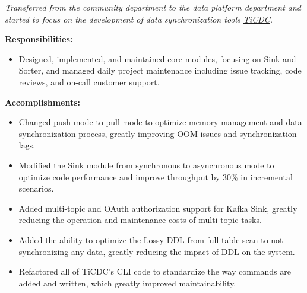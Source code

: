 \documentclass{software_engineer_dongpo_liu}
\newcommand{\en}[1]{#1}
\newcommand{\zh}[1]{}
\begin{document}
\en{}
\zh{\datedsubsection{\textbf{\href{https://pingcap.com/zh/}{PingCAP Inc. - 数据库 - 数据库工具研发（Golang/Rust）}}}{2021/07 -- 2023/07}}
\en{\textsl{Transferred from the community department to the data platform department and started to focus on the development of data synchronization tools {\href{https://github.com/pingcap/tiflow}{TiCDC}}.}}
\zh{\textsl{从社区部门转组到数据平台部门，开始专注于数据同步工具 {\href{https://github.com/pingcap/tiflow}{TiCDC} 的研发。}}}

\en{\textbf{Responsibilities:}}
\zh{\textbf{职责：}}
\begin{itemize}
      \item \en{Designed, implemented, and maintained core modules, focusing on Sink and Sorter, and managed daily project maintenance including issue tracking, code reviews, and on-call customer support.}
            \zh{设计、实现和维护核心模块，专注于 Sink 和 Sorter，管理项目日常维护，包括 issue 追踪、代码审阅和 on-call 客户支持。}
\end{itemize}

\en{\textbf{Accomplishments:}}
\zh{\textbf{产出：}}
\begin{itemize}
      \item \en{Changed push mode to pull mode to optimize memory management and data synchronization process, greatly improving OOM issues and synchronization lags.}
            \zh{将推送模式修改为了拉取模式优化了内存管理和数据同步流程，极大的改善了 OOM 问题和同步延迟。}
      \item \en{Modified the Sink module from synchronous to asynchronous mode to optimize code performance and improve throughput by 30\% in incremental scenarios.}
            \zh{将 Sink 模块从同步模式修改为异步模式，优化代码性能，将增量场景下吞吐提升 30\%。}
      \item \en{ Added multi-topic and OAuth authorization support for Kafka Sink, greatly reducing the operation and maintenance costs of multi-topic tasks.}
            \zh{为 Kafka Sink 支持了多 Topic 和 OAuth 授权功能，极大的降低了多 Topic 的任务运维成本。}
      \item \en{Added the ability to optimize the Lossy DDL from full table scan to not synchronizing any data, greatly reducing the impact of DDL on the system.}
            \zh{将有损 DDL 从全表扫描优化为不同步任何数据，极大的降低了有损 DDL 对系统的影响。}
      \item \en{Refactored all of TiCDC's CLI code to standardize the way commands are added and written, which greatly improved maintainability.}
            \zh{重构了 TiCDC 的 CLI 所有代码，标准化了命令添加和编写方式，极大提升了可维护性。}
\end{itemize}
\end{document}
